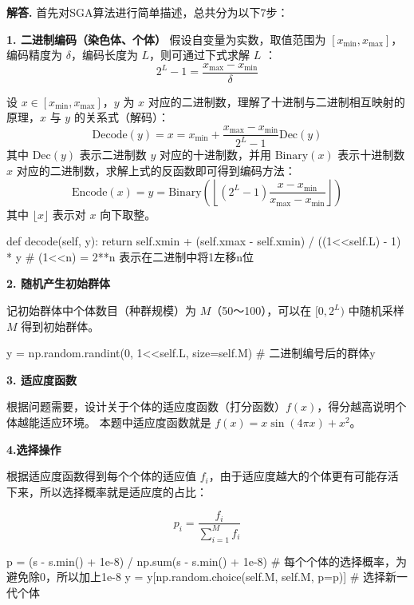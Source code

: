 \documentclass[12pt, a4paper, oneside]{ctexart}
\newenvironment{solution}[1][]{\par\noindent\textbf{#1解答. }}{\smallskip\par}  %
\begin{document}
\begin{solution}
    首先对SGA算法进行简单描述，总共分为以下7步：

\textbf{1. 二进制编码（染色体、个体）}
假设自变量为实数，取值范围为 \([x_{\min},x_{\max}]\)，编码精度为
\(\delta\)，编码长度为 \(L\)，则可通过下式求解 \(L\) ：
\begin{equation*}
   2^L - 1 = \frac{x_{\max}-x_{\min}}{\delta}
\end{equation*}

设 \(x\in[x_{\min},x_{\max}]\)，\(y\) 为 \(x\)
对应的二进制数，理解了十进制与二进制相互映射的原理，\(x\) 与 \(y\)
的关系式（解码）：
\begin{equation*}
    \text{Decode}(y)=x = x_{\min}+\frac{x_{\max}-x_{\min}}{2^L-1}\text{Dec}(y)
\end{equation*}
其中 \(\text{Dec}(y)\) 表示二进制数 \(y\) 对应的十进制数，并用
\(\text{Binary}(x)\) 表示十进制数 \(x\)
对应的二进制数，求解上式的反函数即可得到编码方法：
\begin{equation*}
   \text{Encode}(x) = y = \text{Binary}\left(\left\lfloor(2^L-1)\frac{x-x_{\min}}{x_{\max}-x_{\min}}\right\rfloor\right) 
\end{equation*}
其中 \(\lfloor x\rfloor\) 表示对 \(x\) 向下取整。
\begin{pythoncode}
def decode(self, y):
    return self.xmin + (self.xmax - self.xmin) / ((1<<self.L) - 1) * y
# (1<<n) = 2**n 表示在二进制中将1左移n位
\end{pythoncode}

\textbf{2. 随机产生初始群体}

记初始群体中个体数目（种群规模）为 \(M\)（50～100），可以在
\([0,2^{L})\) 中随机采样 \(M\) 得到初始群体。

\begin{pythoncode}
y = np.random.randint(0, 1<<self.L, size=self.M)  # 二进制编号后的群体y
\end{pythoncode}

\textbf{3. 适应度函数}

根据问题需要，设计关于个体的适应度函数（打分函数）\(f(x)\)，得分越高说明个体越能适应环境。
本题中适应度函数就是 \(f(x) = x\sin(4\pi x)+x^2\)。

\textbf{4.选择操作}

根据适应度函数得到每个个体的适应值
\(f_i\)，由于适应度越大的个体更有可能存活下来，所以选择概率就是适应度的占比：

\[p_i = \frac{f_i}{\sum_{i=1}^Mf_i}\]

\begin{pythoncode}
p = (s - s.min() + 1e-8) / np.sum(s - s.min() + 1e-8)  # 每个个体的选择概率，为避免除0，所以加上1e-8
y = y[np.random.choice(self.M, self.M, p=p)]  # 选择新一代个体
\end{pythoncode}


\end{solution}
\end{document}
